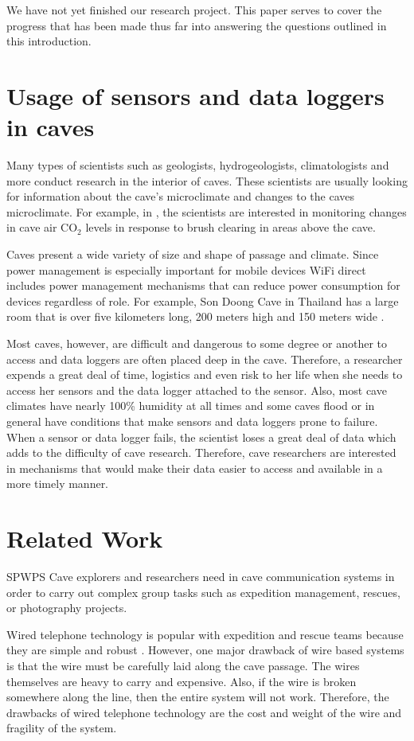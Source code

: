 \documentclass[10pt,twocolumn]{article}
\begin{document}
We have not yet finished our research project. 
This paper serves to cover the progress that has been made thus far into answering the questions outlined in this introduction. 

\section{Usage of sensors and data loggers in caves}

Many types of scientists such as geologists, hydrogeologists, climatologists and more conduct research in the interior of caves. 
These scientists are usually looking for information about the cave's microclimate and changes to the caves microclimate. 
For example, in \cite{wong2010}, the scientists are interested in monitoring changes in cave air CO$_2$ levels in response to brush clearing in areas above the cave. 

Caves present a wide variety of size and shape of passage and climate. 
Since power management is especially important for mobile devices WiFi direct includes power management mechanisms that can reduce power consumption for devices regardless of role.
For example, Son Doong Cave in Thailand has a large room that is over five kilometers long, 200 meters high and 150 meters wide \cite{sondoong}.

Most caves, however, are difficult and dangerous to some degree or another to access and data loggers are often placed deep in the cave.
Therefore, a researcher expends a great deal of time, logistics and even risk to her life when she needs to access her sensors and the data logger attached to the sensor.
Also, most cave climates have nearly 100\% humidity at all times and some caves flood or in general have conditions that make sensors and data loggers prone to failure.
When a sensor or data logger fails, the scientist loses a great deal of data which adds to the difficulty of cave research.
Therefore, cave researchers are interested in mechanisms that would make their data easier to access and available in a more timely manner.

\section{Related Work}SPWPS
Cave explorers and researchers need in cave communication systems in order to carry out complex group tasks such as expedition management, rescues, or photography projects.

Wired telephone technology is popular with expedition and rescue teams because they are simple and robust \cite{cavecomm}.
However, one major drawback of wire based systems is that the wire must be carefully laid along the cave passage. 
The wires themselves are heavy to carry and expensive.
Also, if the wire is broken somewhere along the line, then the entire system will not work.
Therefore, the drawbacks of wired telephone technology are the cost and weight of the wire and fragility of the system.
\end{document}

